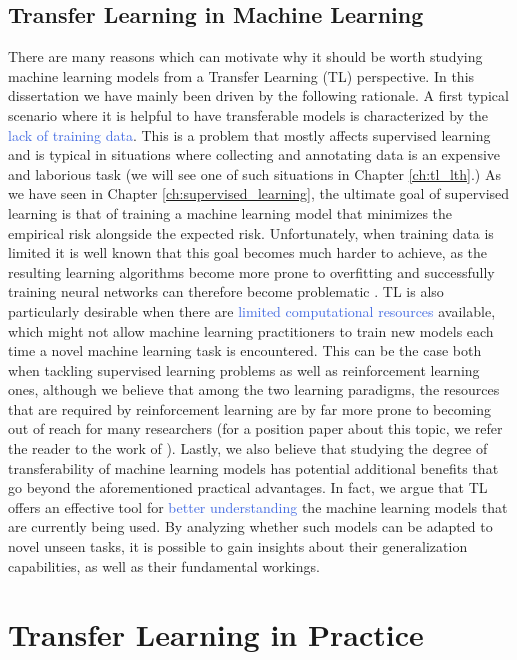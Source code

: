 \subsection{Transfer Learning in Machine Learning}
There are many reasons which can motivate why it should be worth studying machine learning models from a Transfer Learning (TL) perspective. In this dissertation we have mainly been driven by the following rationale. A first typical scenario where it is helpful to have transferable models is characterized by the \textcolor{RoyalBlue}{lack of training data}. This is a problem that mostly affects supervised learning and is typical in situations where collecting and annotating data is an expensive and laborious task (we will see one of such situations in Chapter \ref{ch:tl_lth}.) As we have seen in Chapter \ref{ch:supervised_learning}, the ultimate goal of supervised learning is that of training a machine learning model that minimizes the empirical risk alongside the expected risk. Unfortunately, when training data is limited it is well known that this goal becomes much harder to achieve, as the resulting learning algorithms become more prone to overfitting and successfully training neural networks can therefore become problematic \cite{aggarwal2018neural}. 
TL is also particularly desirable when there are \textcolor{RoyalBlue}{limited computational resources} available, which might not allow machine learning practitioners to train new models each time a novel machine learning task is encountered. This can be the case both when tackling supervised learning problems as well as reinforcement learning ones, although we believe that among the two learning paradigms, the resources that are required by reinforcement learning are by far more prone to becoming out of reach for many researchers (for a position paper about this topic, we refer the reader to the work of \citet{obando2020revisiting}).
Lastly, we also believe that studying the degree of transferability of machine learning models has potential additional benefits that go beyond the aforementioned practical advantages. In fact, we argue that TL offers an effective tool for \textcolor{RoyalBlue}{better understanding} the machine learning models that are currently being used. By analyzing whether such models can be adapted to novel unseen tasks, it is possible to gain insights about their generalization capabilities, as well as their fundamental workings.


\section{Transfer Learning in Practice}
\label{sec:rationale}

